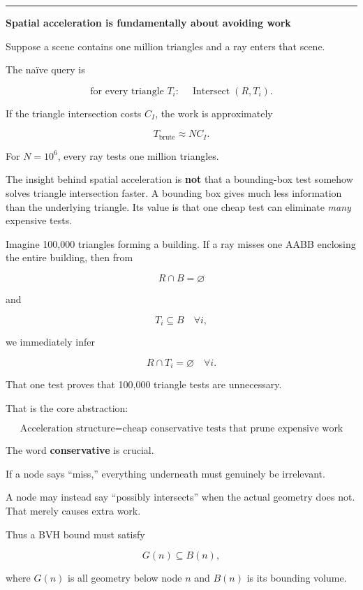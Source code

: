 \begin{center}\rule{0.5\linewidth}{0.5pt}\end{center}

\textbf{Spatial acceleration is fundamentally about avoiding work}

Suppose a scene contains one million triangles and a ray enters that scene.

The naïve query is

\[
\text{for every triangle }T_i:\quad
\operatorname{Intersect}(R,T_i).
\]

If the triangle intersection costs \(C_I\), the work is approximately

\[
T_{\text{brute}}
\approx N C_I.
\]

For \(N=10^6\), every ray tests one million triangles.

The insight behind spatial acceleration is \textbf{not} that a bounding-box test somehow solves triangle intersection faster. A bounding box gives much less information than the underlying triangle. Its value is that one cheap test can eliminate \emph{many} expensive tests.

Imagine 100,000 triangles forming a building. If a ray misses one AABB enclosing the entire building, then from

\[
R\cap B=\varnothing
\]

and

\[
T_i\subseteq B\quad \forall i,
\]

we immediately infer

\[
R\cap T_i=\varnothing\quad \forall i.
\]

That one test proves that 100,000 triangle tests are unnecessary.

That is the core abstraction:

\[
\boxed{\text{Acceleration structure}=
\text{cheap conservative tests that prune expensive work}}
\]

The word \textbf{conservative} is crucial.

If a node says ``miss,'' everything underneath must genuinely be irrelevant.

A node may instead say ``possibly intersects'' when the actual geometry does not. That merely causes extra work.

Thus a BVH bound must satisfy

\[
G(n)\subseteq B(n),
\]

where \(G(n)\) is all geometry below node \(n\) and \(B(n)\) is its bounding volume.

